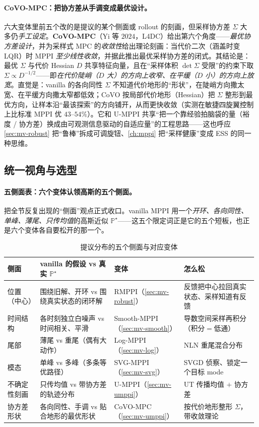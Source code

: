 \paragraph{CoVO-MPC：把协方差从手调变成最优设计。}
六大变体里前五个改的是提议的某个侧面或 rollout 的刻画，但采样协方差 $\Sigma$ 大多仍\emph{手工设定}。\textbf{CoVO-MPC}（Yi 等 $2024$，L4DC）给出第六个角度——\emph{最优协方差设计}，并为采样式 MPC 的\emph{收敛性}给出理论刻画：当代价二次（涵盖时变 LQR）时 MPPI \emph{至少线性收敛}，并据此推出最优采样协方差的闭式\cite{yi2024covo}。其结论是：最优 $\Sigma$ 与代价 Hessian $D$ 共享特征向量，且在“采样体积 $\det\Sigma$ 受限”的约束下取 $\Sigma\propto D^{-1/2}$——即\emph{在代价陡峭（$D$ 大）的方向上收窄、在平缓（$D$ 小）的方向上放宽}。直觉是：vanilla 的各向同性 $\Sigma$ 不知道代价地形的“形状”，在陡峭方向撒太宽、在平缓方向撒太窄都低效；CoVO 按局部代价地形（Hessian）把 $\Sigma$ 整形到最优方向，让样本沿“最该探索”的方向铺开，从而更快收敛（实测在敏捷四旋翼控制上比标准 MPPI 优 $43$--$54\%$）。它和 U-MPPI 共享“把一个靠经验拍脑袋的量（裕度 / 协方差）换成由可观测信息驱动的自适应量”的工程思路——这也呼应 \cref{sec:mv-robust} 把“鲁棒”拆成可调旋钮、\cref{ch:mppi} 把“采样健康”变成 ESS 的同一种思维。

\subsection{统一视角与选型}
\label{sec:mv-select}

\paragraph{五侧面表：六个变体认领高斯的五个侧面。}
把全节反复出现的“侧面”观点正式收口。vanilla MPPI 用一个\emph{开环、各向同性、单峰、薄尾、只传均值}的高斯近似 $\mathbb{P}^\star$——这五个限定词正是它的五个短板，也正是六个变体各自要松开的那一个。

\begin{table}[H]\centering\small
\caption{提议分布的五个侧面与对应变体}
\label{tab:mv-sides}
\begin{tabular}{p{} p{} p{} p{}}
\toprule
侧面 & vanilla 的假设 vs 真实 $\mathbb{P}^\star$ & 变体 & 怎么松 \\
\midrule
位置（中心） & 围绕旧解、开环 vs 围绕真实状态的闭环解 & RMPPI（\cref{sec:mv-robust}） & 反馈把中心拉回真实状态、采样知道有反馈 \\
时间结构 & 各时刻独立白噪声 vs 时间相关、平滑 & Smooth-MPPI（\cref{sec:mv-smooth}） & 导数空间采样再积分（积分$=$低通） \\
尾部 & 薄尾 vs 重尾（偶有大动作） & Log-MPPI（\cref{sec:mv-log}） & NLN 重尾混合分布 \\
模态 & 单峰 vs 多峰（多条等优路径） & SVG-MPPI（\cref{sec:mv-svg}） & SVGD 侦察、锁定一个目标 mode \\
不确定性刻画 & 只传均值 vs 带协方差的轨迹分布 & U-MPPI（\cref{sec:mv-umppi}） & UT 传播均值 $+$ 协方差 \\
协方差形状 & 各向同性、手调 vs 贴合地形的最优形状 & CoVO-MPC（\cref{sec:mv-umppi}） & 按代价地形整形 $\Sigma$，带收敛理论 \\
\bottomrule
\end{tabular}
\end{table}

